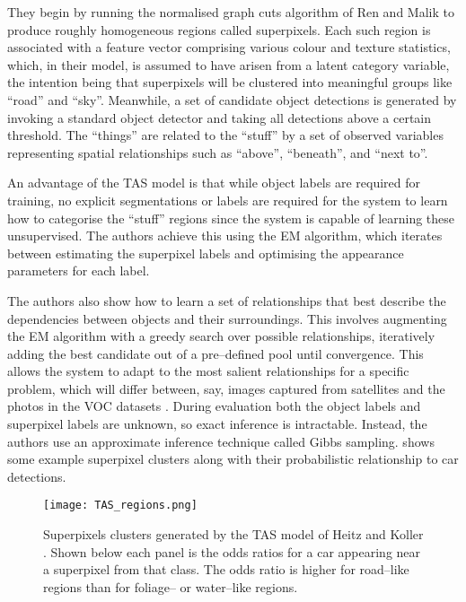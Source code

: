 They begin by running the normalised graph cuts algorithm of Ren and
Malik \cite{Ren03} to produce roughly homogeneous regions called
superpixels. Each such region is associated with a feature vector
comprising various colour and texture statistics, which, in their
model, is assumed to have arisen from a latent category variable, the
intention being that superpixels will be clustered into meaningful
groups like ``road'' and ``sky''. Meanwhile, a set of candidate object
detections is generated by invoking a standard object detector and
taking all detections above a certain threshold. The ``things'' are
related to the ``stuff'' by a set of observed variables representing
spatial relationships such as ``above'', ``beneath'', and ``next to''.

An advantage of the TAS model is that while object labels are required
for training, no explicit segmentations or labels are required for the
system to learn how to categorise the ``stuff'' regions since the
system is capable of learning these unsupervised. The authors achieve
this using the EM algorithm, which iterates between estimating the
superpixel labels and optimising the appearance parameters for each
label.

The authors also show how to learn a set of relationships that best
describe the dependencies between objects and their surroundings. This
involves augmenting the EM algorithm with a greedy search over
possible relationships, iteratively adding the best candidate out of a
pre--defined pool until convergence. This allows the system to adapt
to the most salient relationships for a specific problem, which will
differ between, say, images captured from satellites and the photos in
the VOC datasets \cite{VOC2009}. During evaluation both the object
labels and superpixel labels are unknown, so exact inference is
intractable. Instead, the authors use an approximate inference
technique called Gibbs sampling.   shows some
example superpixel clusters along with their probabilistic
relationship to car detections.

\begin{figure}[htp]
\centering
\texttt{[image: TAS\_regions.png]}
\caption{Superpixels clusters generated by the TAS model of Heitz and
  Koller \cite{Heitz08}. Shown below each panel is the odds ratios for
  a car appearing near a superpixel from that class. The odds ratio is
  higher for road--like regions than for foliage-- or water--like
  regions.}
\label{fig:TAS-regions}
\end{figure}


